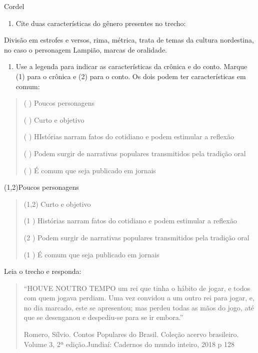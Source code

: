 Cordel

\begin{enumerate}
\def\labelenumi{\arabic{enumi})}
\setcounter{enumi}{3}
\tightlist
\item
  Cite duas características do gênero presentes no trecho:
\end{enumerate}

Divisão em estrofes e versos, rima, métrica, trata de temas da cultura
nordestina, no caso o personagem Lampião, marcas de oralidade.

\begin{enumerate}
\def\labelenumi{\arabic{enumi})}
\setcounter{enumi}{4}
\tightlist
\item
  Use a legenda para indicar as características da crônica e do conto.
  Marque (1) para o crônica e (2) para o conto. Os dois podem ter
  características em comum:
\end{enumerate}

\begin{quote}
( ) Poucos personagens

( ) Curto e objetivo

( ) HIstórias narram fatos do cotidiano e podem estimular a reflexão

( ) Podem surgir de narrativas populares transmitidos pela tradição oral

( ) É comum que seja publicado em jornais
\end{quote}

(1,2)Poucos personagens

\begin{quote}
(1,2) Curto e objetivo

(1 ) Histórias narram fatos do cotidiano e podem estimular a reflexão

(2 ) Podem surgir de narrativas populares transmitidos pela tradição
oral

(1 ) É comum que seja publicado em jornais
\end{quote}

Leia o trecho e responda:

\begin{quote}
``HOUVE NOUTRO TEMPO um rei que tinha o hábito de jogar, e todos com
quem jogava perdiam. Uma vez convidou a um outro rei para jogar, e, no
dia marcado, este se apresentou; mas perdeu todas as mãos do jogo, até
que se desenganou e despediu-se para se ir embora.''

Romero, Sílvio. Contos Populares do Brasil. Coleção acervo brasileiro.
Volume 3, 2ª edição.Jundiaí: Cadernos do mundo inteiro, 2018 p 128
\end{quote}

